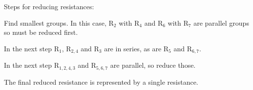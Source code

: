 \documentclass[12pt]{article}
\begin{document}
\begin{flushleft}

Steps for reducing resistances:
\begin{minipage}[t]{\linewidth}
\end{minipage}
\begin{enumerate}
\medskip
\item Find smallest groups. In this case, R$_2$ with R$_4$ and R$_6$ with R$_7$ are parallel groups so must be reduced first.
\begin{minipage}[t]{\linewidth}
\end{minipage}
\medskip
\item In the next step R$_1$, R$_{2,4}$ and R$_3$ are in series, as are R$_5$ and R$_{6,7}$.
\begin{minipage}[t]{\linewidth}
\end{minipage}
\medskip
\item In the next step R$_{1,2,4,3}$ and R$_{5,6,7}$ are parallel, so reduce those.

\begin{minipage}[t]{\linewidth}

\item The final reduced resistance is represented by a single resistance.

\end{minipage}
\end{enumerate}
\end{flushleft}
\end{document}
